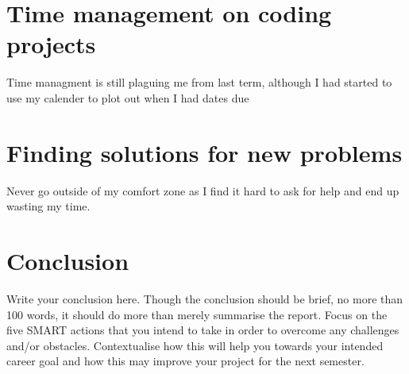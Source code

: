 \documentclass{scrartcl}
\begin{document}
\section{Time management on coding projects}
Time managment is still plaguing me from last term, although I had started to use my calender to plot out when I had dates due 

\section{Finding solutions for new problems}
Never go outside of my comfort zone as I find it hard to ask for help and end up wasting my time. 

\section{Conclusion}

Write your conclusion here. Though the conclusion should be brief, no more than 100 words, it should do more than merely summarise the report. Focus on the five SMART actions that you intend to take in order to overcome any challenges and/or obstacles. Contextualise how this will help you towards your intended career goal and how this may improve your project for the next semester.





\end{document}
